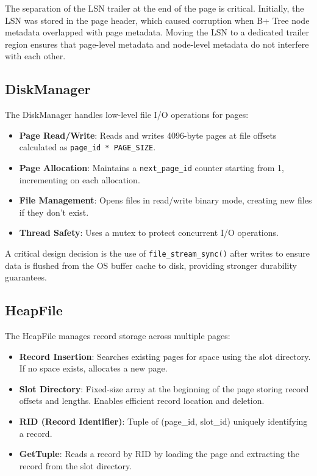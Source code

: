 \documentclass{article}
\begin{document}
The separation of the LSN trailer at the end of the page is critical. Initially, the LSN was stored in the page header, which caused corruption when B+ Tree node metadata overlapped with page metadata. Moving the LSN to a dedicated trailer region ensures that page-level metadata and node-level metadata do not interfere with each other.

\subsection{DiskManager}

The DiskManager handles low-level file I/O operations for pages:

\begin{itemize}
    \item \textbf{Page Read/Write}: Reads and writes 4096-byte pages at file offsets calculated as \texttt{page\_id * PAGE\_SIZE}.
    \item \textbf{Page Allocation}: Maintains a \texttt{next\_page\_id} counter starting from 1, incrementing on each allocation.
    \item \textbf{File Management}: Opens files in read/write binary mode, creating new files if they don't exist.
    \item \textbf{Thread Safety}: Uses a mutex to protect concurrent I/O operations.
\end{itemize}

A critical design decision is the use of \texttt{file\_stream\_sync()} after writes to ensure data is flushed from the OS buffer cache to disk, providing stronger durability guarantees.

\subsection{HeapFile}

The HeapFile manages record storage across multiple pages:

\begin{itemize}
    \item \textbf{Record Insertion}: Searches existing pages for space using the slot directory. If no space exists, allocates a new page.
    \item \textbf{Slot Directory}: Fixed-size array at the beginning of the page storing record offsets and lengths. Enables efficient record location and deletion.
    \item \textbf{RID (Record Identifier)}: Tuple of (page\_id, slot\_id) uniquely identifying a record.
    \item \textbf{GetTuple}: Reads a record by RID by loading the page and extracting the record from the slot directory.
\end{itemize}
\end{document}
